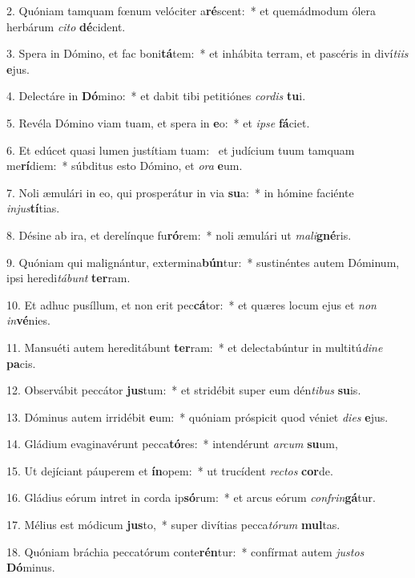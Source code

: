 2. Quóniam tamquam fœnum velóciter a\textbf{ré}scent:~*  et quemádmodum ólera herbárum \textit{ci}\textit{to} \textbf{dé}cident.\

3. Spera in Dómino, et fac boni\textbf{tá}tem:~*  et inhábita terram, et pascéris in diví\textit{ti}\textit{is} \textbf{e}jus.\

4. Delectáre in \textbf{Dó}mino:~*  et dabit tibi petitiónes \textit{cor}\textit{dis} \textbf{tu}i.\

5. Revéla Dómino viam tuam, et spera in \textbf{e}o:~*  et \textit{ip}\textit{se} \textbf{fá}ciet.\

6. Et edúcet quasi lumen justítiam tuam: \dag\  et judícium tuum tamquam me\textbf{rí}diem:~*  súbditus esto Dómino, et \textit{o}\textit{ra} \textbf{e}um.\

7. Noli æmulári in eo, qui prosperátur in via \textbf{su}a:~*  in hómine faciénte \textit{in}\textit{jus}\textbf{tí}tias.\

8. Désine ab ira, et derelínque fu\textbf{ró}rem:~*  noli æmulári ut \textit{ma}\textit{li}\textbf{gné}ris.\

9. Quóniam qui malignántur, extermina\textbf{bún}tur:~*  sustinéntes autem Dóminum, ipsi heredi\textit{tá}\textit{bunt} \textbf{ter}ram.\

10. Et adhuc pusíllum, et non erit pec\textbf{cá}tor:~*  et quæres locum ejus et \textit{non} \textit{in}\textbf{vé}nies.\

11. Mansuéti autem hereditábunt \textbf{ter}ram:~*  et delectabúntur in multitú\textit{di}\textit{ne} \textbf{pa}cis.\

12. Observábit peccátor \textbf{jus}tum:~*  et stridébit super eum dén\textit{ti}\textit{bus} \textbf{su}is.\

13. Dóminus autem irridébit \textbf{e}um:~*  quóniam próspicit quod véniet \textit{di}\textit{es} \textbf{e}jus.\

14. Gládium evaginavérunt pecca\textbf{tó}res:~*  intendérunt \textit{ar}\textit{cum} \textbf{su}um,\

15. Ut dejíciant páuperem et \textbf{ín}opem:~*  ut trucídent \textit{rec}\textit{tos} \textbf{cor}de.\

16. Gládius eórum intret in corda ip\textbf{só}rum:~*  et arcus eórum \textit{con}\textit{frin}\textbf{gá}tur.\

17. Mélius est módicum \textbf{jus}to,~*  super divítias pecca\textit{tó}\textit{rum} \textbf{mul}tas.\

18. Quóniam bráchia peccatórum conte\textbf{rén}tur:~*  confírmat autem \textit{jus}\textit{tos} \textbf{Dó}minus.\

